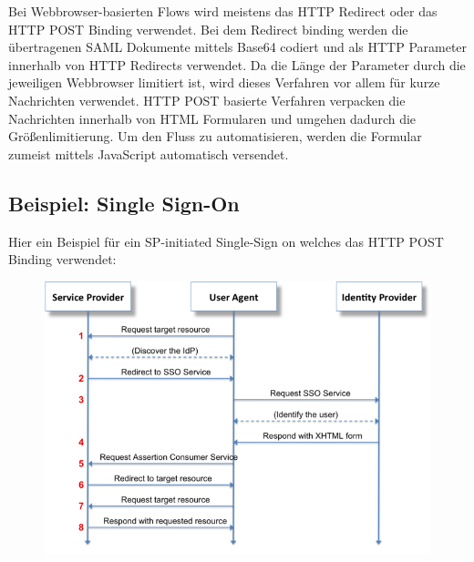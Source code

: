 Bei Webbrowser-basierten Flows wird meistens das HTTP Redirect oder das HTTP POST Binding verwendet. Bei dem Redirect binding werden die übertragenen SAML Dokumente mittels Base64 codiert und als HTTP Parameter innerhalb von HTTP Redirects verwendet. Da die Länge der Parameter durch die jeweiligen Webbrowser limitiert ist, wird dieses Verfahren vor allem für kurze Nachrichten verwendet. HTTP POST basierte Verfahren verpacken die Nachrichten innerhalb von HTML Formularen und umgehen dadurch die Größenlimitierung. Um den Fluss zu automatisieren, werden die Formular zumeist mittels JavaScript automatisch versendet.

\subsection{Beispiel: Single Sign-On}

Hier ein Beispiel für ein SP-initiated Single-Sign on welches das HTTP POST Binding verwendet:

\begin{figure}[h!]
\includegraphics{images/Saml2-browser-sso-redirect-post.png}
\centering
\end{figure}

